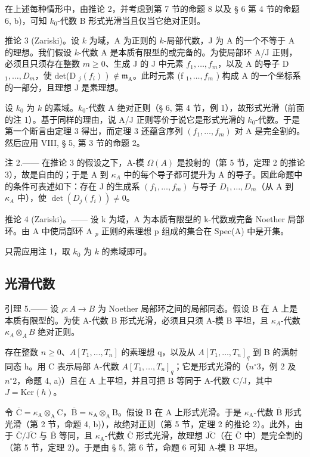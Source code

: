 在上述每种情形中，由推论 2，并考虑到第 7 节的命题 8 以及 § 6 第 4 节的命题 6, b)，可知 \(k_0\)-代数 B 形式光滑当且仅当它绝对正则。

推论 3 (Zariski)。设 \(k\) 为域，A 为正则的 \(k\)-局部代数，J 为 A 的一个不等于 A 的理想。我们假设 \(k\)-代数 A 是本质有限型的或完备的。为使局部环 A/J 正则，必须且只须存在整数 \(m \geqslant 0\)、生成 J 的 J 中元素 \(f_1, \ldots, f_m\)，以及 A 的导子 D \(_1, \ldots, D_m\)，使 det(D \(_j(f_i)\) ) \(\not\in \mathfrak{m}_{\mathrm{A}}\)。此时元素 (f \(_1, \ldots, f_m\) ) 构成 A 的一个坐标系的一部分，且理想 J 是素理想。

设 \(k_0\) 为 \(k\) 的素域。\(k_0\)-代数 A 绝对正则（§ 6, 第 4 节，例 1），故形式光滑（前面的注 1）。基于同样的理由，说 A/J 正则等价于说它是形式光滑的 \(k_0\)-代数。于是第一个断言由定理 3 得出，而定理 3 还蕴含序列 \((f_1,\ldots,f_m)\) 对 A 是完全割的。然后应用 VIII, § 5, 第 3 节的命题 2。

注 2.—— 在推论 3 的假设之下，A-模 \(\Omega(A)\) 是投射的（第 5 节，定理 2 的推论 3），故是自由的；于是 A 到 \(\kappa_{A}\) 中的每个导子都可提升为 A 的导子。因此命题中的条件可表述如下：存在 J 的生成系 \((f_{1},\ldots,f_{m})\) 与导子 \(D_{1},\ldots,D_{m}\)（从 A 到 \(\kappa_{A}\) 中），使 \(\det(D_{j}(f_{i}))\neq0\)。

推论 4 (Zariski)。—— 设 k 为域，A 为本质有限型的 k-代数或完备 Noether 局部环。由 A 中使局部环 A \(_{p}\) 正则的素理想 p 组成的集合在 Spec(A) 中是开集。

只需应用注 1，取 \(k_0\) 为 \(k\) 的素域即可。

\subsection{光滑代数}

引理 5.—— 设 \(\rho: A \to B\) 为 Noether 局部环之间的局部同态。假设 B 在 A 上是本质有限型的。为使 A-代数 B 形式光滑，必须且只须 A-模 B 平坦，且 \(\kappa_{A}\)-代数 \(\kappa_{A} \otimes_{A} B\) 绝对正则。

存在整数 \(n \geqslant 0\)、\(A[T_{1}, \ldots, T_{n}]\) 的素理想 q，以及从 \(A[T_{1}, \ldots, T_{n}]_{q}\) 到 B 的满射同态 h。用 C 表示局部 A-代数 \(A[T_{1}, \ldots, T_{n}]_{q}\)；它是形式光滑的（\(n^{\circ} 3\)，例 2 及 \(n^{\circ} 2\)，命题 4, a)）且在 A 上平坦，并且可把 B 等同于 A-代数 C/J，其中 \(J = \text{Ker}(h)\)。

令 \(\overline{\mathrm{C}} = \kappa_{\mathrm{A}} \otimes_{\mathrm{A}} \mathrm{C}\)，\(\overline{\mathrm{B}} = \kappa_{\mathrm{A}} \otimes_{\mathrm{A}} \mathrm{B}\)。假设 B 在 A 上形式光滑。于是 \(\kappa_{\mathrm{A}}\)-代数 \(\overline{\mathrm{B}}\) 形式光滑（第 2 节，命题 4, b)），故绝对正则（第 5 节，定理 2 的推论 2）。此外，由于 \(\overline{\mathrm{C}} / \overline{\mathrm{JC}}\) 与 \(\overline{\mathrm{B}}\) 等同，且 \(\kappa_{\mathrm{A}}\)-代数 \(\overline{\mathrm{C}}\) 形式光滑，故理想 \(\overline{\mathrm{JC}}\)（在 \(\overline{\mathrm{C}}\) 中）是完全割的（第 5 节，定理 2）。于是由 § 5, 第 6 节，命题 6 可知 A-模 B 平坦。

